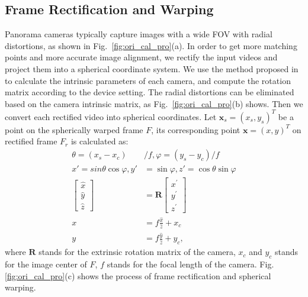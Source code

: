 \documentclass[conference]{IEEEtran}
\begin{document}
\subsection{Frame Rectification and Warping}
\label{ssec:Pre-prepared}

Panorama cameras typically capture images with a wide FOV with radial distortions, as shown in Fig.~\ref{fig:ori_cal_pro}(a).
In order to get more matching points and more accurate image alignment, we rectify the input videos and project them into a spherical coordinate system.
We use the method proposed in \cite{zhang2000flexible} to calculate the intrinsic parameters of each camera, and compute the rotation matrix according to the device setting. 
%
The radial distortions can be eliminated based on the camera intrinsic matrix, as Fig.~\ref{fig:ori_cal_pro}(b) shows.
%
Then we convert each rectified video into spherical coordinates.
Let $\mathbf{x}_{s} = (x_{s},y_{s})^T$ be a point on the spherically
warped frame $F$, its corresponding point $\mathbf{x} = (x, y)^T$ on rectified frame $F_r$ is calculated as:
\begin{equation}
\begin{aligned}
\theta =\left(x_{s}-x_{c}\right) &/ f , \varphi =\left(y_{s} -y_{c}\right) / f \\
x'=sin\theta \cos\varphi, y'&=\sin\varphi, z'=\cos\theta \sin\varphi \\
\left[ \begin{array}{l}{\hat{x}} \\ {\hat{y}} \\ {\hat{z}}\end{array}\right]&=\textbf{R} \left[ \begin{array}{l}{x^{\prime}} \\ {y^{\prime}} \\ {z^{\prime}}\end{array}\right]\\
x&=f\frac{\hat{x}}{\hat{z}}+x_c\\
y&=f\frac{\hat{y}}{\hat{z}}+y_c,
\end{aligned}
\end{equation}
where $\textbf{R}$ stands for the extrinsic rotation matrix of the camera, $x_c$ and $y_c$ stands for the image center of $F$, $f$ stands for the focal length of the camera.
Fig. \ref{fig:ori_cal_pro}(c) shows the process of frame rectification and spherical warping. 
\end{document}
